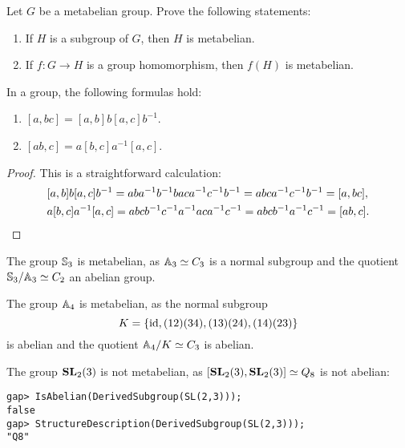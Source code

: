 
\begin{exercise}
\label{xca:metabelian2}
Let $G$ be a metabelian group. Prove the following statements: 
\begin{enumerate}
\item If $H$ is a subgroup of $G$, then $H$ is metabelian.
\item If $f\colon G\to H$ is a group homomorphism, then $f(H)$ is metabelian. 
\end{enumerate}
\end{exercise}

\begin{lemma}
In a group, the following formulas hold:
\begin{enumerate}
	\item $[a,bc]=[a,b]b[a,c]b^{-1}$. 
	\item $[ab,c]=a[b,c]a^{-1}[a,c]$.
\end{enumerate}
\end{lemma}

\begin{proof}
This is a straightforward calculation:
\begin{align*}
&[a,b]b[a,c]b^{-1}=aba^{-1}b^{-1}baca^{-1}c^{-1}b^{-1}=abca^{-1}c^{-1}b^{-1}=[a,bc],\\
&a[b,c]a^{-1}[a,c]=abcb^{-1}c^{-1}a^{-1}aca^{-1}c^{-1}=abcb^{-1}a^{-1}c^{-1}=[ab,c].\qedhere
\end{align*}
\end{proof}

\begin{example}
The group $\mathbb{S}_3$ is metabelian, as $\mathbb{A}_3\simeq C_3$ is a normal subgroup 
and the quotient $\mathbb{S}_3/\mathbb{A}_3\simeq C_2$ an abelian group. 
\end{example}

\begin{example}
The group $\mathbb{A}_4$ is metabelian, as the normal subgroup
\[
K=\{\operatorname{id},(12)(34),(13)(24),(14)(23)\}
\]
is abelian and the quotient 
$\mathbb{A}_4/K\simeq C_3$ is abelian.
\end{example}

\begin{example}
The group $\mathbf{SL}_2(3)$ is not metabelian, as $[\mathbf{SL}_2(3),\mathbf{SL}_2(3)]\simeq Q_8$ 
is not abelian: 
\begin{lstlisting}
gap> IsAbelian(DerivedSubgroup(SL(2,3)));
false
gap> StructureDescription(DerivedSubgroup(SL(2,3)));
"Q8"
\end{lstlisting}
\end{example}

